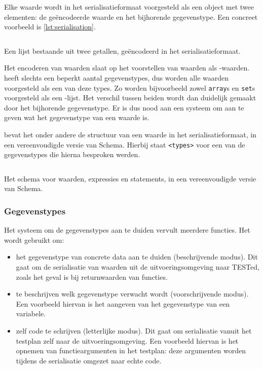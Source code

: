 Elke waarde wordt in het serialisatieformaat voorgesteld als een object met twee elementen: de geëncodeerde waarde en het bijhorende gegevenstype.
Een concreet voorbeeld is \cref{lst:serialisation}.

\begin{listing}
    \inputminted{json}{code/format.json}
    \caption{Een lijst bestaande uit twee getallen, geëncodeerd in het serialisatieformaat.}
    \label{lst:serialisation}
\end{listing}

Het encoderen van waarden slaat op het voorstellen van waarden als -waarden.
 heeft slechts een beperkt aantal gegevenstypes, dus worden alle waarden voorgesteld als een van deze types.
Zo worden bijvoorbeeld zowel \texttt{array}s en \texttt{set}s voorgesteld als een -lijst.
Het verschil tussen beiden wordt dan duidelijk gemaakt door het bijhorende gegevenstype.
Er is dus nood aan een systeem om aan te geven wat het gegevenstype van een waarde is.

 bevat het onder andere de structuur van een waarde in het serialisatieformaat, in een vereenvoudigde versie van  Schema.
Hierbij staat \texttt{<types>} voor een van de gegevenstypes die hierna besproken werden.

\begin{listing}
    \inputminted{json}{code/type-schema.json}
    \caption{Het schema voor waarden, expressies en statements, in een vereenvoudigde versie van  Schema.}
    \label{lst:type-schema}
\end{listing}

\subsubsection{Gegevenstypes}

Het systeem om de gegevenstypes aan te duiden vervult meerdere functies.
Het wordt gebruikt om:

\begin{itemize}
    \item het gegevenstype van concrete data aan te duiden (beschrijvende modus).
    Dit gaat om de serialisatie van waarden uit de uitvoeringsomgeving naar TESTed, zoals het geval is bij returnwaarden van functies.
    \item te beschrijven welk gegevenstype verwacht wordt (voorschrijvende modus).
    Een voorbeeld hiervan is het aangeven van het gegevenstype van een variabele.
    \item zelf code te schrijven (letterlijke modus).
    Dit gaat om serialisatie vanuit het testplan zelf naar de uitvoeringsomgeving.
    Een voorbeeld hiervan is het opnemen van functieargumenten in het testplan: deze argumenten worden tijdens de serialisatie omgezet naar echte code.
\end{itemize}


